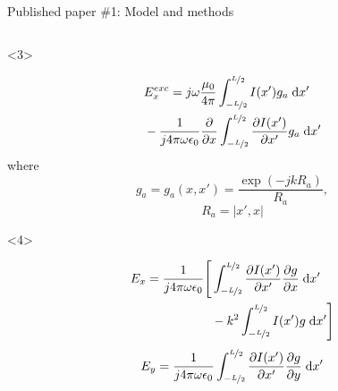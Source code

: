 \documentclass[xcolor=dvipsnames,10pt]{beamer}
\begin{document}
\begin{frame}{Published paper \#1: Model and methods}
\begin{onlyenv}
\begin{columns}[c]
\begin{column}{0.4\textwidth}
\begin{onlyenv}
\begin{center}
                    \end{center}
                \end{onlyenv}
                \begin{onlyenv}<3>
                    \begin{footnotesize}
                        \begin{equation*}
                            \begin{aligned}
                                {}&E_{x}^{exc} = j \omega \frac{\mu_0}{4\pi} \int_{-\nicefrac{L}{2}}^{\nicefrac{L}{2}}I(x') g_a \; \mathrm{d}x' \\
                                & - \frac{1}{j4\pi\omega\epsilon_0}\frac{\partial}{\partial x} \int_{-\nicefrac{L}{2}}^{\nicefrac{L}{2}}\frac{\partial I(x')}{\partial x'} g_a \; \mathrm{d}x'
                            \end{aligned}
                        \end{equation*}
                        where
                        \begin{equation*}
                            g_a = g_a(x, x') = \frac{\exp{(-jkR_a)}}{R_a},
                        \end{equation*}
                        \begin{equation*}
                            R_a = \lvert x', x \rvert
                        \end{equation*}
                    \end{footnotesize}
                \end{onlyenv}
                \begin{onlyenv}<4>
                    \begin{footnotesize}
                        \begin{equation*}
                            \begin{aligned}
                            E_x = \frac{1}{j4\pi\omega\epsilon_0} \Bigg[{}&  \int_{-\nicefrac{L}{2}}^{\nicefrac{L}{2}} \frac{\partial I(x')}{\partial x'} \frac{\partial g}{\partial x} \; \mathrm{d}x' \\
                            &  -k^2 \int_{-\nicefrac{L}{2}}^{\nicefrac{L}{2}} I(x') g \; \mathrm{d}x' \Bigg]
                            \end{aligned}
                        \end{equation*}
                        \begin{equation*}
                            E_y = \frac{1}{j4\pi\omega\epsilon_0} \int_{-\nicefrac{L}{2}}^{\nicefrac{L}{2}} \frac{\partial I(x')}{\partial x'} \frac{\partial g}{\partial y} \; \mathrm{d}x'

\end{equation*}
\end{footnotesize}
\end{onlyenv}
\end{column}
\end{columns}
\end{onlyenv}
\end{frame}
\end{document}
